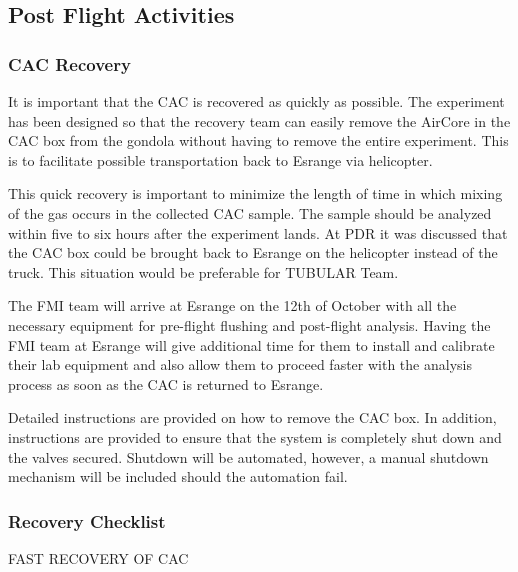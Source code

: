 \subsection{Post Flight Activities}

\subsubsection{CAC Recovery}
It is important that the CAC is recovered as quickly as possible. The experiment has been designed so that the recovery team can easily remove the AirCore in the CAC box from the gondola without having to remove the entire experiment. This is to facilitate possible transportation back to Esrange via helicopter.

This quick recovery is important to minimize the length of time in which mixing of the gas occurs in the collected CAC sample. The sample should be analyzed within five to six hours after the experiment lands. At PDR it was discussed that the CAC box could be brought back to Esrange on the helicopter instead of the truck. This situation would be preferable for TUBULAR Team. 

The FMI team will arrive at Esrange on the 12th of October with all the necessary equipment for pre-flight flushing and post-flight analysis. Having the FMI team at Esrange will give additional time for them to install and calibrate their lab equipment and also allow them to proceed faster with the analysis process as soon as the CAC is returned to Esrange. 

Detailed instructions are provided on how to remove the CAC box. In addition, instructions are provided to ensure that the system is completely shut down and the valves secured. Shutdown will be automated, however, a manual shutdown mechanism will be included should the automation fail.

\subsubsection{Recovery Checklist}
\label{sec:recovery-checklist}

FAST RECOVERY OF CAC

